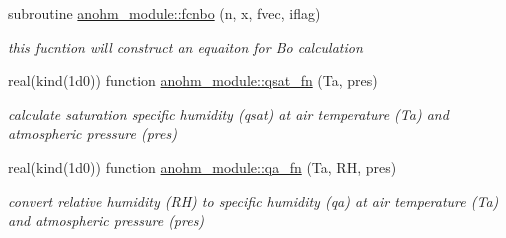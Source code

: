 \begin{DoxyCompactItemize}
subroutine \hyperlink{namespaceanohm__module_a6111dd73f21e92071faa29d426ae84f9}{anohm\+\_\+module\+::fcnbo} (n, x, fvec, iflag)
\begin{DoxyCompactList}\small\item\em this fucntion will construct an equaiton for Bo calculation \end{DoxyCompactList}\item 
real(kind(1d0)) function \hyperlink{namespaceanohm__module_a0db1439a632619dd005b69ce0fcb9cbe}{anohm\+\_\+module\+::qsat\+\_\+fn} (Ta, pres)
\begin{DoxyCompactList}\small\item\em calculate saturation specific humidity (qsat) at air temperature (Ta) and atmospheric pressure (pres) \end{DoxyCompactList}\item 
real(kind(1d0)) function \hyperlink{namespaceanohm__module_ac9feb33254cb5595d19ad7f8a012ef92}{anohm\+\_\+module\+::qa\+\_\+fn} (Ta, RH, pres)
\begin{DoxyCompactList}\small\item\em convert relative humidity (RH) to specific humidity (qa) at air temperature (Ta) and atmospheric pressure (pres) \end{DoxyCompactList}\end{DoxyCompactItemize}
